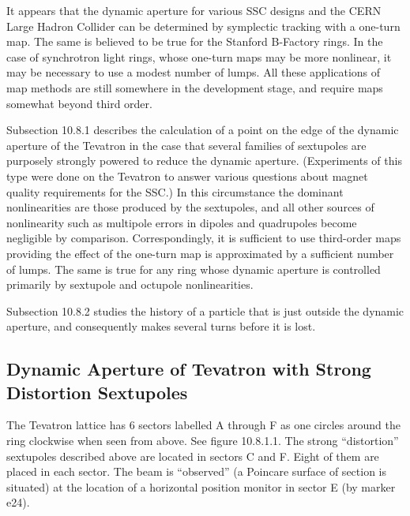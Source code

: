 It appears that the dynamic aperture for various SSC designs and the CERN
Large Hadron Collider can be determined by symplectic tracking with a
one-turn map.  The same is believed to be true for the Stanford B-Factory rings.
In the case of synchrotron light rings, whose one-turn maps may be more nonlinear,
it may be necessary to use a modest number of lumps.  All these applications
of map methods are still somewhere in the development stage, and require maps
somewhat beyond third order.

Subsection 10.8.1 describes the calculation of a point on the edge of the dynamic aperture of the Tevatron in the case that several families of sextupoles are purposely
strongly powered to reduce the dynamic aperture.  (Experiments of this type were
done on the Tevatron to answer various questions about magnet quality
requirements for the  SSC.)  In this circumstance the dominant
nonlinearities are those produced by the sextupoles, and all other sources of
nonlinearity such as multipole errors in dipoles and quadrupoles become
negligible by comparison.  Correspondingly, it is sufficient to use third-order
maps providing the effect of the one-turn map is approximated by a
sufficient number of lumps.  The same is true for any ring whose dynamic
aperture is controlled primarily by sextupole and octupole nonlinearities.

Subsection 10.8.2 studies the history of a particle that is just outside
the dynamic aperture, and consequently makes several turns before it is
lost.

\subsection{Dynamic Aperture of Tevatron with Strong Distortion Sextupoles}
\label{teva}
The Tevatron lattice
has 6 sectors labelled A through F as one circles around the ring
clockwise when seen from above.  See figure 10.8.1.1.  The strong
``distortion'' sextupoles described above
are located in
sectors C and F.  Eight of them are placed in each sector.  The beam is
``observed'' (a Poincare surface of section is situated) at the location
of a horizontal position monitor in sector E (by marker e24).

